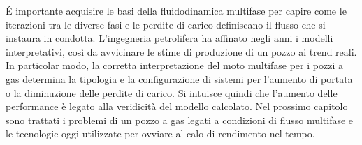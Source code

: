 \'E importante acquisire le basi della fluidodinamica multifase per capire come le iterazioni tra le diverse fasi e le perdite di carico definiscano il flusso che si instaura in condotta. L'ingegneria petrolifera ha affinato negli anni i modelli interpretativi, così da avvicinare le stime di produzione di un pozzo ai trend reali. In particolar modo, la corretta interpretazione del moto multifase per i pozzi a gas determina la tipologia e la configurazione di sistemi per l'aumento di portata o la diminuzione delle perdite di carico. Si intuisce quindi che l'aumento delle performance è legato alla veridicità del modello calcolato. Nel prossimo capitolo sono trattati i problemi di un pozzo a gas legati a condizioni di flusso multifase e le tecnologie oggi utilizzate per ovviare al calo di rendimento nel tempo.

